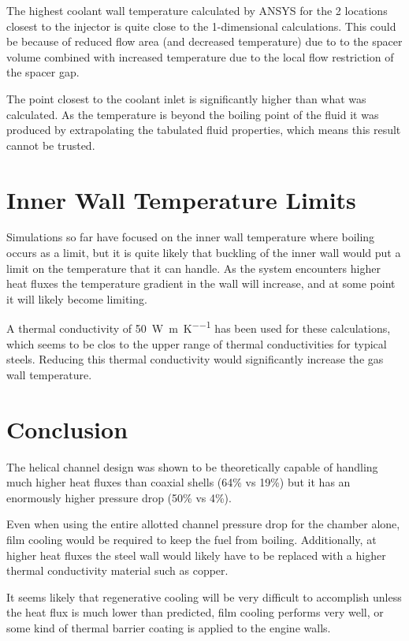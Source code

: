 \documentclass[11pt]{article}
\begin{document}
The highest coolant wall temperature calculated by ANSYS for the 2 locations closest to the injector is quite close to the 1-dimensional calculations. This could be because of reduced flow area (and decreased temperature) due to to the spacer volume combined with increased temperature due to the local flow restriction of the spacer gap.

The point closest to the coolant inlet is significantly higher than what was calculated. As the temperature is beyond the boiling point of the fluid it was produced by extrapolating the tabulated fluid properties, which means this result cannot be trusted.

\section{Inner Wall Temperature Limits}

Simulations so far have focused on the inner wall temperature where boiling occurs as a limit, but it is quite likely that buckling of the inner wall would put a limit on the temperature that it can handle. As the system encounters higher heat fluxes the temperature gradient in the wall will increase, and at some point it will likely become limiting.

A thermal conductivity of \SI{50}{\watt\per\meter\per\kelvin} has been used for these calculations, which seems to be clos to the upper range of thermal conductivities for typical steels. Reducing this thermal conductivity would significantly increase the gas wall temperature.

\section{Conclusion}

The helical channel design was shown to be theoretically capable of handling much higher heat fluxes than coaxial shells (64\% vs 19\%) but it has an enormously higher pressure drop (50\% vs 4\%).

Even when using the entire allotted channel pressure drop for the chamber alone, film cooling would be required to keep the fuel from boiling. Additionally, at higher heat fluxes the steel wall would likely have to be replaced with a higher thermal conductivity material such as copper.

It seems likely that regenerative cooling will be very difficult to accomplish unless the heat flux is much lower than predicted, film cooling performs very well, or some kind of thermal barrier coating is applied to the engine walls.
\end{document}
